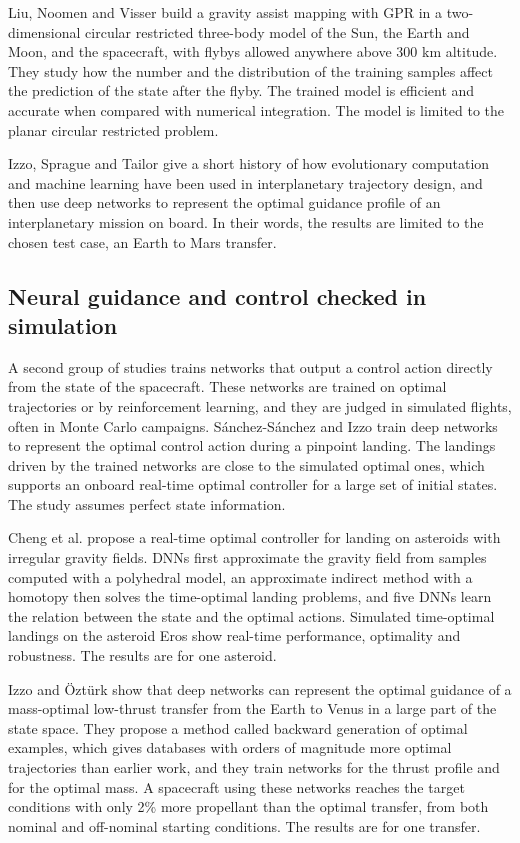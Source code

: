 Liu, Noomen and Visser \cite{liu2021} build a gravity assist mapping with GPR in a two-dimensional circular restricted three-body model of the Sun, the Earth and Moon, and the spacecraft, with flybys allowed anywhere above 300 km altitude. They study how the number and the distribution of the training samples affect the prediction of the state after the flyby. The trained model is efficient and accurate when compared with numerical integration. The model is limited to the planar circular restricted problem.

Izzo, Sprague and Tailor \cite{izzo2019ml} give a short history of how evolutionary computation and machine learning have been used in interplanetary trajectory design, and then use deep networks to represent the optimal guidance profile of an interplanetary mission on board. In their words, the results are limited to the chosen test case, an Earth to Mars transfer.

\subsection{Neural guidance and control checked in simulation}
\label{sec:rw-gnc}

A second group of studies trains networks that output a control action directly from the state of the spacecraft. These networks are trained on optimal trajectories or by reinforcement learning, and they are judged in simulated flights, often in Monte Carlo campaigns. Sánchez-Sánchez and Izzo \cite{sanchez2018} train deep networks to represent the optimal control action during a pinpoint landing. The landings driven by the trained networks are close to the simulated optimal ones, which supports an onboard real-time optimal controller for a large set of initial states. The study assumes perfect state information.

Cheng et al. \cite{cheng2020} propose a real-time optimal controller for landing on asteroids with irregular gravity fields. DNNs first approximate the gravity field from samples computed with a polyhedral model, an approximate indirect method with a homotopy then solves the time-optimal landing problems, and five DNNs learn the relation between the state and the optimal actions. Simulated time-optimal landings on the asteroid Eros show real-time performance, optimality and robustness. The results are for one asteroid.

Izzo and Öztürk \cite{izzo2021} show that deep networks can represent the optimal guidance of a mass-optimal low-thrust transfer from the Earth to Venus in a large part of the state space. They propose a method called backward generation of optimal examples, which gives databases with orders of magnitude more optimal trajectories than earlier work, and they train networks for the thrust profile and for the optimal mass. A spacecraft using these networks reaches the target conditions with only 2\% more propellant than the optimal transfer, from both nominal and off-nominal starting conditions. The results are for one transfer.

